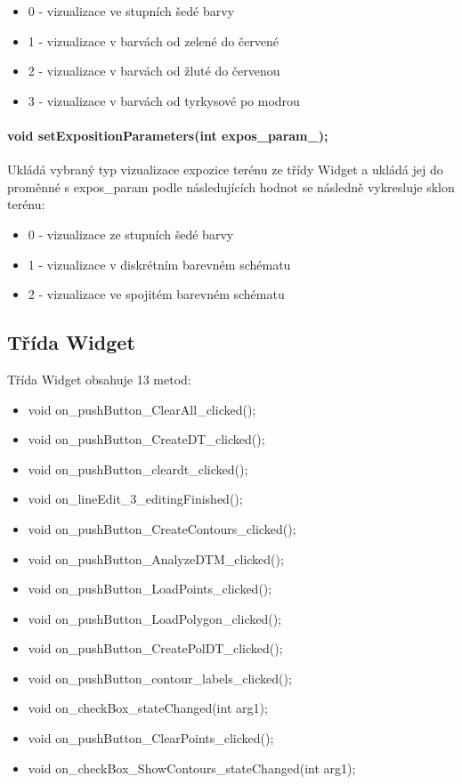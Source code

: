 \documentclass[11pt]{article}
\begin{document}
\begin {itemize}
	\item 0 - vizualizace ve stupních šedé barvy
	\item 1 - vizualizace v barvách od zelené do červené
	\item 2 - vizualizace v barvách od žluté do červenou
	\item 3 - vizualizace v barvách od tyrkysové po modrou
\end {itemize}
  
\paragraph {void setExpositionParameters(int expos\_param\_);}
Ukládá vybraný typ vizualizace expozice terénu ze třídy Widget a ukládá jej do proměnné s expos\_param podle následujících hodnot se následně vykresluje sklon terénu: 

\begin{itemize}
	\item 0 - vizualizace ze stupních šedé barvy
	\item 1 - vizualizace v diskrétním barevném schématu
	\item 2 - vizualizace ve spojitém barevném schématu
\end{itemize}

\subsection{Třída Widget}
Třída Widget obsahuje 13 metod:

\begin{itemize}
	\item void on\_pushButton\_ClearAll\_clicked();
	\item void on\_pushButton\_CreateDT\_clicked();
	\item void on\_pushButton\_cleardt\_clicked();
	\item void on\_lineEdit\_3\_editingFinished();
	\item void on\_pushButton\_CreateContours\_clicked();
	\item void on\_pushButton\_AnalyzeDTM\_clicked();
	\item void on\_pushButton\_LoadPoints\_clicked();
	\item void on\_pushButton\_LoadPolygon\_clicked();
	\item void on\_pushButton\_CreatePolDT\_clicked();
	\item void on\_pushButton\_contour\_labels\_clicked();
	\item void on\_checkBox\_stateChanged(int arg1);
	\item void on\_pushButton\_ClearPoints\_clicked();
	\item void on\_checkBox\_ShowContours\_stateChanged(int arg1);
\end{itemize}
\end{document}
